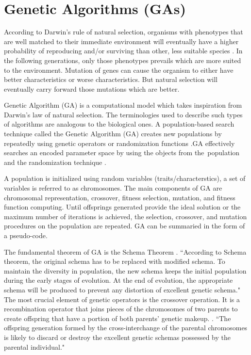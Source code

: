 \section{Genetic Algorithms (GAs)}
According to Darwin's rule of natural selection, organisms with phenotypes that are well matched to their immediate environment will eventually have a higher probability of reproducing and/or surviving than other, less suitable species \citep{DODSON1976243}. In the following generations, only those phenotypes prevails which are more suited to the environment. Mutation of genes can cause the organism to either have better characteristics or worse characteristics. But natural selection will eventually carry forward those mutations which are better.\par
Genetic Algorithm (GA) is a computational model which takes inspiration from Darwin's law of natural selection. The terminologies used to describe such types of algorithms are analogous to the biological ones. A population-based search technique called the Genetic Algorithm (GA) creates new populations by repeatedly using genetic operators or randomization functions \citep{Katoch2021}.GA effectively searches an encoded parameter space by using the objects from the population and the randomization technique \citep{Liu2019}.

A population is initialized using random variables (traits/characterstics), a set of variables is referred to as chromosomes. The main components of GA are chromosomal representation, crossover, fitness selection,  mutation, and fitness function computing. Until offsprings generated provide the ideal solution or the maximum number of iterations is achieved, the selection, crossover, and mutation procedures on the population are repeated. GA can be summaried in the form of a pseudo-code. \par



The fundamental theorem of GA is the Schema Theorem \citep{Liu2019}. ``According to Schema theorem, the original schema has to be replaced with modified schema. To maintain the diversity in population, the new schema keeps the initial population during the early stages of evolution. At the end of evolution, the appropriate schema will be produced to prevent any distortion of excellent genetic schema." \citep{Katoch2021} The most crucial element of genetic operators is the crossover operation. It is a recombination operator that joins pieces of the chromosomes of two parents to create offspring that have a portion of both parents' genetic makeup. \citep{Tang1996}. ``The offspring generation formed by the cross-interchange of the parental chromosomes is likely to discard or destroy the excellent genetic schemas possessed by the parental individual."\citep{Liu2019} \par

